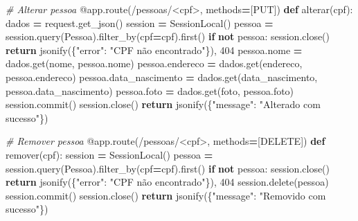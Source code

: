 \documentclass[
]{book}
\newenvironment{Shaded}{\begin{snugshade}}{\end{snugshade}}
\newcommand{\AttributeTok}[1]{\textcolor[rgb]{0.13,0.29,0.53}{#1}}
\newcommand{\CommentTok}[1]{\textcolor[rgb]{0.56,0.35,0.01}{\textit{#1}}}
\newcommand{\ControlFlowTok}[1]{\textcolor[rgb]{0.13,0.29,0.53}{\textbf{#1}}}
\newcommand{\DecValTok}[1]{\textcolor[rgb]{0.00,0.00,0.81}{#1}}
\newcommand{\KeywordTok}[1]{\textcolor[rgb]{0.13,0.29,0.53}{\textbf{#1}}}
\newcommand{\NormalTok}[1]{#1}
\newcommand{\OperatorTok}[1]{\textcolor[rgb]{0.81,0.36,0.00}{\textbf{#1}}}
\newcommand{\StringTok}[1]{\textcolor[rgb]{0.31,0.60,0.02}{#1}}
\begin{document}
\begin{Shaded}
\begin{Highlighting}[]
\CommentTok{\# Alterar pessoa}
\AttributeTok{@app.route}\NormalTok{(}\StringTok{\textquotesingle{}/pessoas/\textless{}cpf\textgreater{}\textquotesingle{}}\NormalTok{, methods}\OperatorTok{=}\NormalTok{[}\StringTok{\textquotesingle{}PUT\textquotesingle{}}\NormalTok{])}
\KeywordTok{def}\NormalTok{ alterar(cpf):}
\NormalTok{    dados }\OperatorTok{=}\NormalTok{ request.get\_json()}
\NormalTok{    session }\OperatorTok{=}\NormalTok{ SessionLocal()}
\NormalTok{    pessoa }\OperatorTok{=}\NormalTok{ session.query(Pessoa).filter\_by(cpf}\OperatorTok{=}\NormalTok{cpf).first()}
    \ControlFlowTok{if} \KeywordTok{not}\NormalTok{ pessoa:}
\NormalTok{        session.close()}
        \ControlFlowTok{return}\NormalTok{ jsonify(\{}\StringTok{"error"}\NormalTok{: }\StringTok{"CPF não encontrado"}\NormalTok{\}), }\DecValTok{404}
\NormalTok{    pessoa.nome }\OperatorTok{=}\NormalTok{ dados.get(}\StringTok{\textquotesingle{}nome\textquotesingle{}}\NormalTok{, pessoa.nome)}
\NormalTok{    pessoa.endereco }\OperatorTok{=}\NormalTok{ dados.get(}\StringTok{\textquotesingle{}endereco\textquotesingle{}}\NormalTok{, pessoa.endereco)}
\NormalTok{    pessoa.data\_nascimento }\OperatorTok{=}\NormalTok{ dados.get(}\StringTok{\textquotesingle{}data\_nascimento\textquotesingle{}}\NormalTok{, pessoa.data\_nascimento)}
\NormalTok{    pessoa.foto }\OperatorTok{=}\NormalTok{ dados.get(}\StringTok{\textquotesingle{}foto\textquotesingle{}}\NormalTok{, pessoa.foto)}
\NormalTok{    session.commit()}
\NormalTok{    session.close()}
    \ControlFlowTok{return}\NormalTok{ jsonify(\{}\StringTok{"message"}\NormalTok{: }\StringTok{"Alterado com sucesso"}\NormalTok{\})}

\CommentTok{\# Remover pessoa}
\AttributeTok{@app.route}\NormalTok{(}\StringTok{\textquotesingle{}/pessoas/\textless{}cpf\textgreater{}\textquotesingle{}}\NormalTok{, methods}\OperatorTok{=}\NormalTok{[}\StringTok{\textquotesingle{}DELETE\textquotesingle{}}\NormalTok{])}
\KeywordTok{def}\NormalTok{ remover(cpf):}
\NormalTok{    session }\OperatorTok{=}\NormalTok{ SessionLocal()}
\NormalTok{    pessoa }\OperatorTok{=}\NormalTok{ session.query(Pessoa).filter\_by(cpf}\OperatorTok{=}\NormalTok{cpf).first()}
    \ControlFlowTok{if} \KeywordTok{not}\NormalTok{ pessoa:}
\NormalTok{        session.close()}
        \ControlFlowTok{return}\NormalTok{ jsonify(\{}\StringTok{"error"}\NormalTok{: }\StringTok{"CPF não encontrado"}\NormalTok{\}), }\DecValTok{404}
\NormalTok{    session.delete(pessoa)}
\NormalTok{    session.commit()}
\NormalTok{    session.close()}
    \ControlFlowTok{return}\NormalTok{ jsonify(\{}\StringTok{"message"}\NormalTok{: }\StringTok{"Removido com sucesso"}\NormalTok{\})}


\end{Highlighting}
\end{Shaded}
\end{document}
